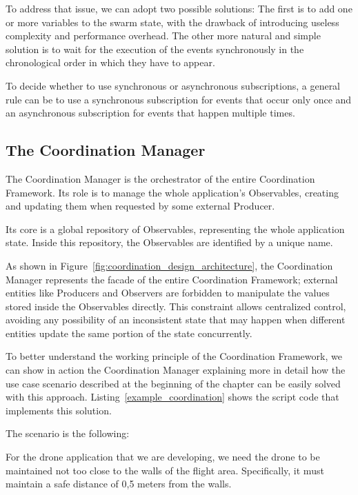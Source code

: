 To address that issue, we can adopt two possible solutions:
The first is to add one or more variables to the swarm state, with the drawback of introducing useless complexity and performance overhead.
The other more natural and simple solution is to wait for the execution of the events synchronously in the chronological order in which they have to appear.

To decide whether to use synchronous or asynchronous subscriptions, a general rule can be to use a synchronous subscription for events that occur only once and an asynchronous subscription for events that happen multiple times.

\subsection{The Coordination Manager}\label{subsec:coordination_manager}

The Coordination Manager is the orchestrator of the entire Coordination Framework. 
Its role is to manage the whole application's Observables, creating and updating them when requested by some external Producer.

Its core is a global repository of Observables, representing the whole application state. 
Inside this repository, the Observables are identified by a unique name. 

As shown in Figure~\ref{fig:coordination_design_architecture}, the Coordination Manager represents the facade of the entire Coordination Framework; external entities like Producers and Observers are forbidden to manipulate the values stored inside the Observables directly.
This constraint allows centralized control, avoiding any possibility of an inconsistent state that may happen when different entities update the same portion of the state concurrently.

To better understand the working principle of the Coordination Framework, we can show in action the Coordination Manager explaining more in detail how the use case scenario described at the beginning of the chapter can be easily solved with this approach.
Listing~\ref{example_coordination} shows the script code that implements this solution.

The scenario is the following:
\begin{displayquote}
    For the drone application that we are developing, we need the drone to be maintained not too close to the walls of the flight area. 
    Specifically, it must maintain a safe distance of 0,5 meters from the walls.
\end{displayquote}

